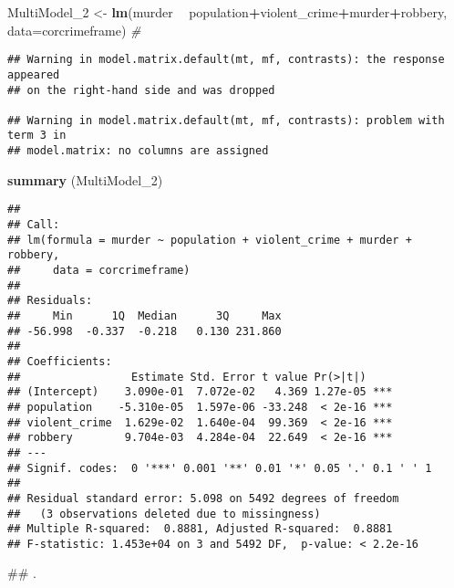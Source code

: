 \documentclass[]{article}
\newenvironment{Shaded}{\begin{snugshade}}{\end{snugshade}}
\newcommand{\KeywordTok}[1]{\textcolor[rgb]{0.13,0.29,0.53}{\textbf{#1}}}
\newcommand{\DataTypeTok}[1]{\textcolor[rgb]{0.13,0.29,0.53}{#1}}
\newcommand{\DecValTok}[1]{\textcolor[rgb]{0.00,0.00,0.81}{#1}}
\newcommand{\StringTok}[1]{\textcolor[rgb]{0.31,0.60,0.02}{#1}}
\newcommand{\CommentTok}[1]{\textcolor[rgb]{0.56,0.35,0.01}{\textit{#1}}}
\newcommand{\OperatorTok}[1]{\textcolor[rgb]{0.81,0.36,0.00}{\textbf{#1}}}
\newcommand{\NormalTok}[1]{#1}
\begin{document}
\begin{Shaded}
\begin{Highlighting}[]
\NormalTok{MultiModel_}\DecValTok{2}\NormalTok{ <-}\StringTok{ }\KeywordTok{lm}\NormalTok{(murder }\OperatorTok{~}\StringTok{ }\NormalTok{population}\OperatorTok{+}\NormalTok{violent_crime}\OperatorTok{+}\NormalTok{murder}\OperatorTok{+}\NormalTok{robbery, }\DataTypeTok{data=}\NormalTok{corcrimeframe)  }\CommentTok{#}
\end{Highlighting}
\end{Shaded}

\begin{verbatim}
## Warning in model.matrix.default(mt, mf, contrasts): the response appeared
## on the right-hand side and was dropped

## Warning in model.matrix.default(mt, mf, contrasts): problem with term 3 in
## model.matrix: no columns are assigned
\end{verbatim}

\begin{Shaded}
\begin{Highlighting}[]
\KeywordTok{summary}\NormalTok{ (MultiModel_}\DecValTok{2}\NormalTok{)}
\end{Highlighting}
\end{Shaded}

\begin{verbatim}
## 
## Call:
## lm(formula = murder ~ population + violent_crime + murder + robbery, 
##     data = corcrimeframe)
## 
## Residuals:
##     Min      1Q  Median      3Q     Max 
## -56.998  -0.337  -0.218   0.130 231.860 
## 
## Coefficients:
##                 Estimate Std. Error t value Pr(>|t|)    
## (Intercept)    3.090e-01  7.072e-02   4.369 1.27e-05 ***
## population    -5.310e-05  1.597e-06 -33.248  < 2e-16 ***
## violent_crime  1.629e-02  1.640e-04  99.369  < 2e-16 ***
## robbery        9.704e-03  4.284e-04  22.649  < 2e-16 ***
## ---
## Signif. codes:  0 '***' 0.001 '**' 0.01 '*' 0.05 '.' 0.1 ' ' 1
## 
## Residual standard error: 5.098 on 5492 degrees of freedom
##   (3 observations deleted due to missingness)
## Multiple R-squared:  0.8881, Adjusted R-squared:  0.8881 
## F-statistic: 1.453e+04 on 3 and 5492 DF,  p-value: < 2.2e-16
\end{verbatim}

\begin{Shaded}
\begin{Highlighting}[]
\NormalTok{## .}
\end{Highlighting}
\end{Shaded}
\end{document}
